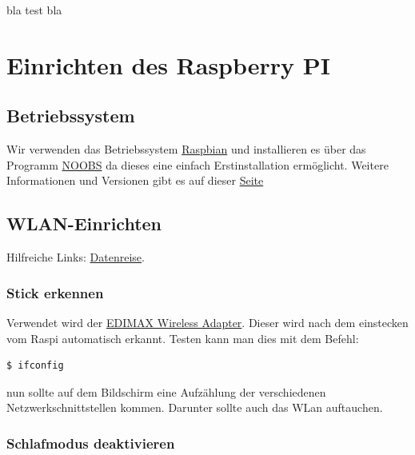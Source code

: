 \documentclass[4paper,0pt]{article}
\begin{document}
\begin{shaded}bla test bla \end{shaded}

\section{Einrichten des Raspberry PI}
\subsection{Betriebssystem}

Wir verwenden das Betriebssystem \href{http://downloads.raspberrypi.org/raspbian_latest}{Raspbian} und installieren es über das Programm \href{http://downloads.raspberrypi.org/NOOBS_latestt}{NOOBS} da dieses eine einfach Erstinstallation ermöglicht. Weitere Informationen und Versionen gibt es auf dieser \href{http://www.raspberrypi.org/}{Seite} 

\subsection{WLAN-Einrichten}

Hilfreiche Links:
\href{https://www.datenreise.de/raspberry-pi-wlan-einrichten-edimax//}{Datenreise}.

\subsubsection{Stick erkennen}

Verwendet wird der \href{http://www.amazon.de/gp/product/B003MTTJOY/ref=as_li_qf_sp_asin_tl?ie=UTF8&camp=1638&creative=6742&creativeASIN=B003MTTJOY&linkCode=as2&tag=dde0b6-21}{EDIMAX Wireless Adapter}. Dieser wird nach dem einstecken vom Raspi automatisch erkannt. Testen kann man dies mit dem Befehl:

\begin{shaded}
\begin{lstlisting}
$ ifconfig
\end{lstlisting}
\end{shaded}

nun sollte auf dem Bildschirm eine Aufzählung der verschiedenen Netzwerkschnittstellen kommen. Darunter sollte auch das WLan auftauchen. 

\subsubsection{Schlafmodus deaktivieren}
\end{document}
